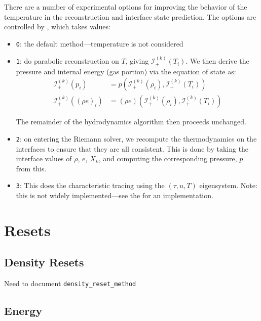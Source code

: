 There are a number of experimental options for improving the behavior
of the temperature in the reconstruction and interface state
prediction.  The options are controlled by ,
which takes values:
\begin{itemize}
  \item {\tt 0}: the default method---temperature is not considered

  \item {\tt 1}: do parabolic reconstruction on $T$, giving
    $\mathcal{I}_{+}^{(k)}(T_i)$.  We then derive the pressure and
    internal energy (gas portion) via the equation of state as:
    \begin{align}
      \mathcal{I}_{+}^{(k)}(p_i) &= p(\mathcal{I}_{+}^{(k)}(\rho_i), \mathcal{I}_{+}^{(k)}(T_i)) \\
      \mathcal{I}_{+}^{(k)}((\rho e)_i) &= (\rho e)(\mathcal{I}_{+}^{(k)}(\rho_i), \mathcal{I}_{+}^{(k)}(T_i))
    \end{align}

    The remainder of the hydrodynamics algorithm then proceeds unchanged.

  \item {\tt 2}: on entering the Riemann solver, we recompute the
    thermodynamics on the interfaces to ensure that they are all
    consistent.  This is done by taking the interface values of
    $\rho$, $e$, $X_k$, and computing the corresponding pressure, $p$
    from this.

  \item {\tt 3}: This does the characteristic tracing using the
    $(\tau, u, T)$ eigensystem.  Note: this is not widely
    implemented---see the  for an
    implementation.

\end{itemize}






\section{Resets}

\subsection{Density Resets}

Need to document {\tt density\_reset\_method}


\subsection{Energy}

